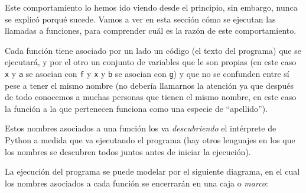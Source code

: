 Este comportamiento lo hemos ido viendo desde el principio, sin embargo,
nunca se explicó porqué sucede.  Vamos a ver en esta sección cómo se
ejecutan las llamadas a funciones, para comprender cuál es la razón de este
comportamiento.

Cada función tiene asociado por un lado un código (el texto del programa)
que se ejecutará, y por el otro un conjunto de variables que le son propias
(en este caso \lstinline!x! y \lstinline!a! se asocian con \lstinline!f! y
\lstinline!x! y \lstinline!b! se asocian con \lstinline!g!) y que no se
confunden entre sí pese a tener el mismo nombre (no debería llamarnos la
atención ya que después de todo conocemos a muchas personas que tienen el
mismo nombre, en este caso la función a la que pertenecen funciona como una
especie de ``apellido'').

Estos nombres asociados a una función los va {\it descubriendo} el intérprete de
Python a medida que va ejecutando el programa (hay otros lenguajes en los
que los nombres se descubren todos juntos antes de iniciar la ejecución).

La ejecución del programa se puede modelar por el siguiente diagrama, en el
cual los nombres asociados a cada función se encerrarán en una caja o {\it
marco}:

